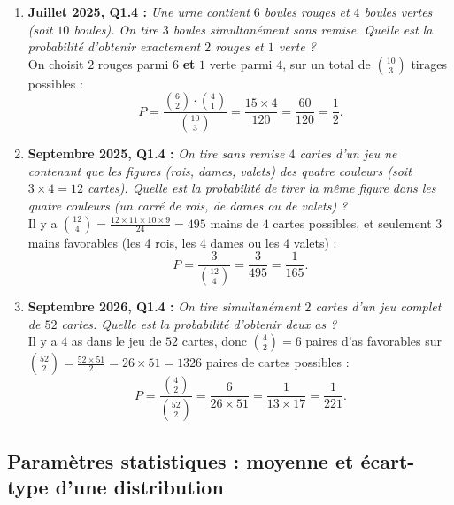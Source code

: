 \begin{exemple}
\begin{enumerate}[resume]
    \item \textbf{Juillet 2025, Q1.4 :} \emph{Une urne contient $6$ boules rouges et $4$ boules vertes (soit $10$ boules). On tire $3$ boules simultanément sans remise. Quelle est la probabilité d'obtenir exactement $2$ rouges et $1$ verte ?}\\
    On choisit $2$ rouges parmi $6$ \textbf{et} $1$ verte parmi $4$, sur un total de $\binom{10}{3}$ tirages possibles :
    \[
        P = \frac{\binom{6}{2} \cdot \binom{4}{1}}{\binom{10}{3}} = \frac{15 \times 4}{120} = \frac{60}{120} = \boxed{\frac{1}{2}}.
    \]

    \item \textbf{Septembre 2025, Q1.4 :} \emph{On tire sans remise $4$ cartes d'un jeu ne contenant que les figures (rois, dames, valets) des quatre couleurs (soit $3 \times 4 = 12$ cartes). Quelle est la probabilité de tirer la même figure dans les quatre couleurs (un carré de rois, de dames ou de valets) ?}\\
    Il y a $\binom{12}{4} = \frac{12 \times 11 \times 10 \times 9}{24} = 495$ mains de $4$ cartes possibles, et seulement $3$ mains favorables (les 4 rois, les 4 dames ou les 4 valets) :
    \[
        P = \frac{3}{\binom{12}{4}} = \frac{3}{495} = \boxed{\frac{1}{165}}.
    \]

    \item \textbf{Septembre 2026, Q1.4 :} \emph{On tire simultanément $2$ cartes d'un jeu complet de $52$ cartes. Quelle est la probabilité d'obtenir deux as ?}\\
    Il y a $4$ as dans le jeu de $52$ cartes, donc $\binom{4}{2} = 6$ paires d'as favorables sur $\binom{52}{2} = \frac{52 \times 51}{2} = 26 \times 51 = 1326$ paires de cartes possibles :
    \[
        P = \frac{\binom{4}{2}}{\binom{52}{2}} = \frac{6}{26 \times 51} = \frac{1}{13 \times 17} = \boxed{\frac{1}{221}}.
    \]
\end{enumerate}
\end{exemple}

\subsection{Paramètres statistiques : moyenne et écart-type d'une distribution}

